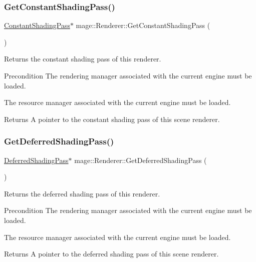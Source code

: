 \subsubsection{\texorpdfstring{Get\+Constant\+Shading\+Pass()}{GetConstantShadingPass()}}
{\footnotesize\ttfamily \hyperlink{classmage_1_1_constant_shading_pass}{Constant\+Shading\+Pass}$\ast$ mage\+::\+Renderer\+::\+Get\+Constant\+Shading\+Pass (\begin{DoxyParamCaption}{ }\end{DoxyParamCaption})}

Returns the constant shading pass of this renderer.

\begin{DoxyPrecond}{Precondition}
The rendering manager associated with the current engine must be loaded. 

The resource manager associated with the current engine must be loaded. 
\end{DoxyPrecond}
\begin{DoxyReturn}{Returns}
A pointer to the constant shading pass of this scene renderer. 
\end{DoxyReturn}
\hypertarget{classmage_1_1_renderer_af678bc2be0c501375b448fc95adad131}{}\label{classmage_1_1_renderer_af678bc2be0c501375b448fc95adad131} 
\subsubsection{\texorpdfstring{Get\+Deferred\+Shading\+Pass()}{GetDeferredShadingPass()}}
{\footnotesize\ttfamily \hyperlink{classmage_1_1_deferred_shading_pass}{Deferred\+Shading\+Pass}$\ast$ mage\+::\+Renderer\+::\+Get\+Deferred\+Shading\+Pass (\begin{DoxyParamCaption}{ }\end{DoxyParamCaption})}

Returns the deferred shading pass of this renderer.

\begin{DoxyPrecond}{Precondition}
The rendering manager associated with the current engine must be loaded. 

The resource manager associated with the current engine must be loaded. 
\end{DoxyPrecond}
\begin{DoxyReturn}{Returns}
A pointer to the deferred shading pass of this scene renderer. 
\end{DoxyReturn}
\hypertarget{classmage_1_1_renderer_ad73ac769e45eeeb9d293b019be996936}{}\label{classmage_1_1_renderer_ad73ac769e45eeeb9d293b019be996936} 
